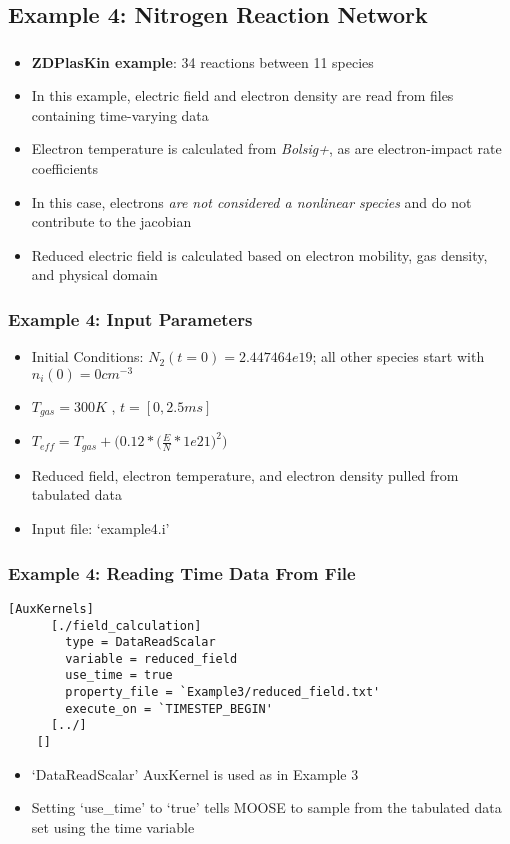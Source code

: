 \subsection{Example 4: Nitrogen Reaction Network}
\begin{frame}[fragile]
	\frametitle{\insertsubsectionhead}
	\begin{itemize}
		\item \textbf{ZDPlasKin example}\footnotemark: 34 reactions between 11 species
		\item In this example, electric field and electron density are read from files containing time-varying data
		\item Electron temperature is calculated from \textit{Bolsig+}, as are electron-impact rate coefficients
		\item In this case, electrons \textit{are not considered a nonlinear species} and do not contribute to the jacobian
		\item Reduced electric field is calculated based on electron mobility, gas density, and physical domain
	\end{itemize}
\end{frame}




\begin{frame}[fragile]
	\frametitle{Example 4: Input Parameters}
	\begin{itemize}
		\item Initial Conditions: $N_2(t=0) = 2.447464e19$; all other species start with $n_i(0) = 0 cm^{-3}$
		\item $T_{gas} = 300 K$ , $t=[0,2.5 ms]$
		\item $T_{eff} = T_{gas}+\Big(0.12 * \Big(\tfrac{E}{N}*1e21 \Big)^2 \Big)$
		\item Reduced field, electron temperature, and electron density pulled from tabulated data 
		\item Input file: `example4.i'
	\end{itemize}
\end{frame}

\begin{frame}[fragile]
	\frametitle{Example 4: Reading Time Data From File}
	\begin{Verbatim}[fontsize=\scriptsize]
    [AuxKernels]
      [./field_calculation]
        type = DataReadScalar
        variable = reduced_field
        use_time = true
        property_file = `Example3/reduced_field.txt'
        execute_on = `TIMESTEP_BEGIN'
      [../]
    []
	\end{Verbatim}
	\begin{itemize}
		\item `DataReadScalar' AuxKernel is used as in Example 3
		\item Setting `use\_time' to `true' tells MOOSE to sample from the tabulated data set using the time variable
	\end{itemize}
\end{frame}

